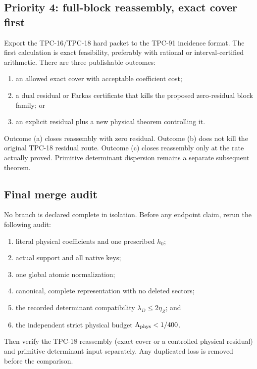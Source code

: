 \subsection{Priority 4: full-block reassembly, exact cover first}

Export the TPC-16/TPC-18 hard packet to the TPC-91 incidence format.
The first calculation is exact feasibility, preferably with rational
or interval-certified arithmetic.  There are three publishable
outcomes:
\begin{enumerate}[label=(\alph*),leftmargin=2.2em]
\item an allowed exact cover with acceptable coefficient cost;
\item a dual residual or Farkas certificate that kills the proposed
  zero-residual block family; or
\item an explicit residual plus a new physical theorem controlling
  it.
\end{enumerate}
Outcome (a) closes reassembly with zero residual.  Outcome (b) does
not kill the original TPC-18 residual route.  Outcome (c) closes
reassembly only at the rate actually proved.  Primitive determinant
dispersion remains a separate subsequent theorem.

\subsection{Final merge audit}

No branch is declared complete in isolation.  Before any endpoint
claim, rerun the following audit:
\begin{enumerate}[label=(\arabic*),leftmargin=2.2em]
\item literal physical coefficients and one prescribed \(h_0\);
\item actual support and all native keys;
\item one global atomic normalization;
\item canonical, complete representation with no deleted sectors;
\item the recorded determinant compatibility
  \(\lambda_D\le2\eta_Z\); and
\item the independent strict physical budget
  \(\Lambda_{\rm phys}<1/400\).
\end{enumerate}
Then verify the TPC-18 reassembly (exact cover or a controlled
physical residual) and primitive determinant input separately.  Any
duplicated loss is removed before the comparison.

